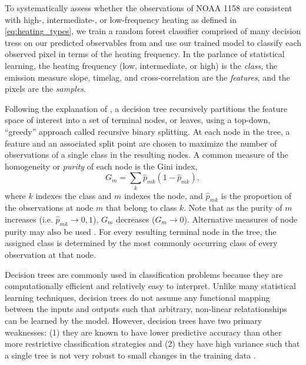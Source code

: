 To systematically assess whether the observations of NOAA 1158 are consistent with high-, intermediate-, or low-frequency heating as defined in \autoref{eq:heating_types}, we train a random forest classifier comprised of many decision tress on our predicted observables from  and use our trained model to classify each observed pixel in terms of the heating frequency. In the parlance of statistical learning, the heating frequency (low, intermediate, or high) is the \textit{class}, the emission measure slope, timelag, and cross-correlation are the \textit{features}, and the pixels are the \textit{samples}.

Following the explanation of \citet[chapter 8]{james_introduction_2013}, a decision tree recursively partitions the feature space of interest into a set of terminal nodes, or leaves, using a top-down, ``greedy'' approach called recursive binary splitting. At each node in the tree, a feature and an associated split point are chosen to maximize the number of observations of a single class in the resulting nodes. A common measure of the homogeneity or \textit{purity} of each node is the Gini index,
\begin{equation}\label{eq:gini-index}
    G_m = \sum_k \hat{p}_{mk} (1 - \hat{p}_{mk}),
\end{equation}
where $k$ indexes the class and $m$ indexes the node, and $\hat{p}_{mk}$ is the proportion of the observations at node $m$ that belong to class $k$. Note that as the purity of $m$ increases (i.e. $\hat{p}_{mk}\to0,1$), $G_m$ decreases ($G_m\to0$). Alternative measures of node purity may also be used \citep[see section 9.2.3 of][]{hastie_elements_2009}. For every resulting terminal node in the tree, the assigned class is determined by the most commonly occurring class of every observation at that node.

Decision trees are commonly used in classification problems because they are computationally efficient and relatively easy to interpret. Unlike many statistical learning techniques, decision trees do not assume any functional mapping between the inputs and outputs such that arbitrary, non-linear relatationships can be learned by the model. However, decision trees have two primary weaknesses: (1) they are known to have lower predictive accuracy than other more restrictive classification strategies and (2) they have high variance such that a single tree is not very robust to small changes in the training data \citep{james_introduction_2013}.

